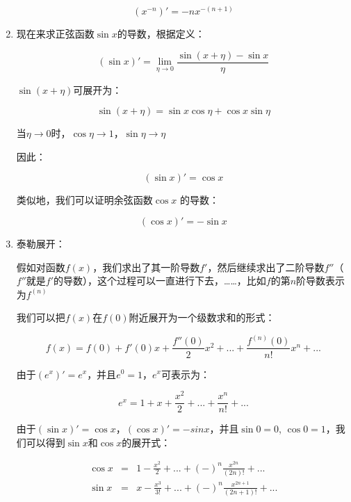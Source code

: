 \begin{enumerate}
\begin{equation}
\left( x^{-n} \right)' = -n x^{-(n+1)}
\end{equation}

\item

现在来求正弦函数$\sin x$的导数，根据定义：

\begin{equation*}
( \sin x)' = \lim\limits_{\eta \to 0} \frac{ \sin (x + \eta) - \sin x }{\eta}
\end{equation*}

$\sin (x + \eta)$可展开为：

\begin{equation*}
\sin (x + \eta) = \sin x \cos \eta + \cos x \sin \eta
\end{equation*}

当$\eta \to 0$时，$\cos \eta \to 1$，$\sin \eta \to \eta$

因此：

\begin{equation}
( \sin x)' = \cos x
\end{equation}

类似地，我们可以证明余弦函数$\cos x$ 的导数：

\begin{equation}
( \cos x )' = - \sin x
\end{equation}

\item

泰勒展开：

假如对函数$f(x)$，我们求出了其一阶导数$f'$，然后继续求出了二阶导数$f''$（$f''$就是$f'$的导数），这个过程可以一直进行下去，……，比如$f$的第$n$阶导数表示为$f^{(n)}$

我们可以把$f(x)$在$f(0)$附近展开为一个级数求和的形式：

\begin{equation}
f(x) = f(0) + f'(0)x+ \frac{f''(0)}{2}x^2 + ... + \frac{f^{(n)} (0) }{n!} x^n + ...
\end{equation}

由于$(e^x)' = e^x$，并且$e^0 = 1$，$e^x$可表示为：

\begin{equation}
e^x = 1 + x + \frac{x^2}{2} + ... + \frac{x^n}{n!} + ...
\end{equation}

由于$(\sin x)' = \cos x$，$(\cos x)' = -sin x$，并且$\sin 0 = 0$, $\cos 0 = 1$，我们可以得到$\sin x$和$\cos x$的展开式：

\begin{eqnarray*}
\cos x &=& 1 - \frac{x^2}{2} +  ... + (-)^n \frac{x^{2n}}{(2n)!} + ... \\
\sin x &=& x - \frac{x^3}{3!} +  ... + (-)^n \frac{ x^{2n+1} }{(2n+1)!} + ...
\end{eqnarray*}

\end{enumerate}

